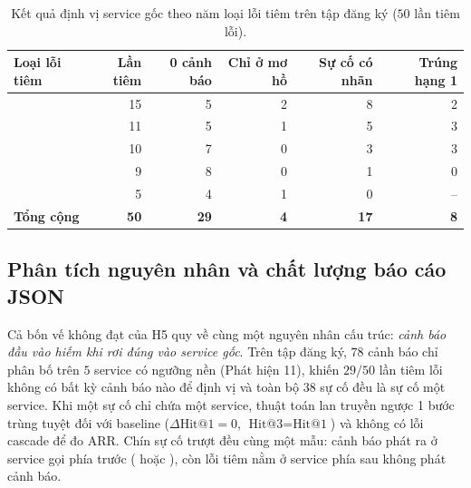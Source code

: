 \begin{table}[htbp]
  \centering
  \caption[Phân rã kết quả định vị RCA theo loại lỗi trên tập test]{Kết quả định vị service gốc theo năm loại lỗi tiêm trên tập  đăng ký ($50$ lần tiêm lỗi).}
  \label{tab:ch5-rca-by-fault}
  \scriptsize
  \renewcommand{\arraystretch}{1.15}
  \begin{tabularx}{\linewidth}{@{}Y r r r r r@{}}
    \toprule
    \textbf{Loại lỗi tiêm} & \textbf{Lần tiêm} & \textbf{0 cảnh báo} & \textbf{Chỉ ở mơ hồ} & \textbf{Sự cố có nhãn} & \textbf{Trúng hạng 1} \\
    \midrule
     & 15 & 5 & 2 & 8 & 2 \\
     & 11 & 5 & 1 & 5 & 3 \\
     & 10 & 7 & 0 & 3 & 3 \\
     & 9 & 8 & 0 & 1 & 0 \\
     & 5 & 4 & 1 & 0 & -- \\
    \midrule
    \textbf{Tổng cộng} & \textbf{50} & \textbf{29} & \textbf{4} & \textbf{17} & \textbf{8} \\
    \bottomrule
  \end{tabularx}
\end{table}

\subsection{Phân tích nguyên nhân và chất lượng báo cáo JSON}
\label{sec:ch5-rca-analysis}

Cả bốn vế không đạt của H5 quy về cùng một nguyên nhân cấu trúc: \emph{cảnh báo đầu vào hiếm khi rơi đúng vào service gốc}. Trên tập đăng ký, $78$ cảnh báo chỉ phân bố trên $5$ service có ngưỡng nền  (Phát hiện 11), khiến $29/50$ lần tiêm lỗi không có bất kỳ cảnh báo nào để định vị và toàn bộ $38$ sự cố đều là sự cố một service. Khi một sự cố chỉ chứa một service, thuật toán lan truyền ngược 1 bước trùng tuyệt đối với baseline ($\Delta\text{Hit@1} = 0$, $\text{Hit@3} = \text{Hit@1}$) và không có lỗi cascade để đo ARR. Chín sự cố trượt đều cùng một mẫu: cảnh báo phát ra ở service gọi phía trước ( hoặc ), còn lỗi tiêm nằm ở service phía sau không phát cảnh báo.

